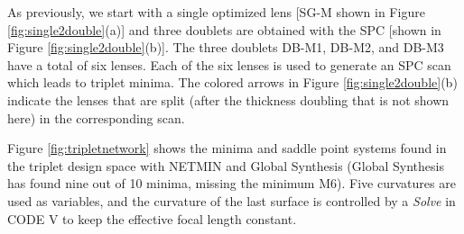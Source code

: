 As previously, we start with a single optimized lens [SG-M shown in Figure \ref{fig:single2double}(a)] and three doublets are obtained with the SPC [shown in Figure \ref{fig:single2double}(b)]. The three doublets DB-M1, DB-M2, and DB-M3 have a total of six lenses.  Each of the six lenses is used to generate an SPC scan which leads to triplet minima. The colored arrows in Figure \ref{fig:single2double}(b) indicate the lenses that are split (after the thickness doubling that is not shown here) in the corresponding scan.

Figure \ref{fig:tripletnetwork} shows the minima and saddle point systems found in the triplet design space with NETMIN and Global Synthesis (Global Synthesis has found nine out of 10 minima, missing the minimum M6). Five curvatures are used as variables, and the curvature of the last surface is controlled by a \textit{Solve} in CODE V to keep the effective focal length constant.

